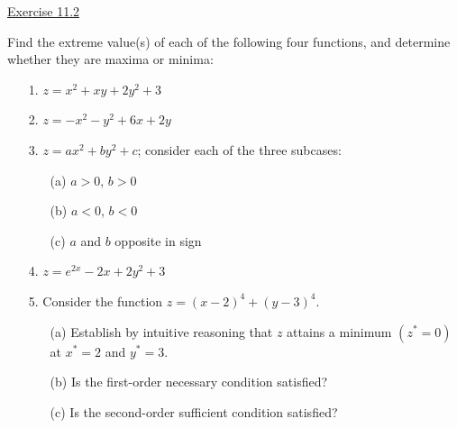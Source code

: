 \underline{Exercise 11.2}

Find the extreme value(s) of each of the following four functions, and determine whether they are maxima or minima:
\begin{enumerate}
\item[1.] $z = x^{2} + xy + 2y^{2} + 3$

\item[2.] $z = -x^{2} - y^{2} + 6x + 2y$

\item[3.] $z = ax^{2} + by^{2} + c$; consider each of the three subcases:
\begin{enumerate}
\item[(a)] $a > 0$, $b > 0$
\item[(b)] $a < 0$, $b < 0$
\item[(c)] $a$ and $b$ opposite in sign
\end{enumerate}

\item[4.] $z = e^{2x} - 2x + 2y^{2} + 3$

\item[5.] Consider the function $z = (x-2)^{4} + (y-3)^{4}$.
\begin{enumerate}
\item[(a)] Establish by intuitive reasoning that $z$ attains a minimum $(z^{*} = 0)$ at $x^{*} = 2$ and $y^{*} = 3$.
\item[(b)] Is the first-order necessary condition satisfied?
\item[(c)] Is the second-order sufficient condition satisfied?
\end{enumerate}

\end{enumerate}
